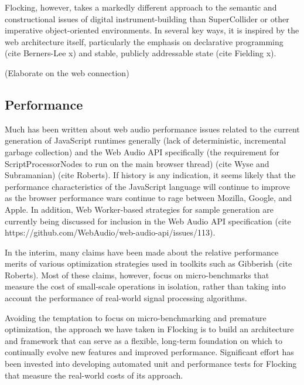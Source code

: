 \documentclass{article}
\begin{document}
Flocking, however, takes a markedly different approach to the semantic and constructional issues of digital instrument-building than SuperCollider or other imperative object-oriented environments. In several key ways, it is inspired by the web architecture itself, particularly the emphasis on declarative programming (cite Berners-Lee x) and stable, publicly addressable state (cite Fielding x).

(Elaborate on the web connection)

\subsection{Performance}

Much has been written about web audio performance issues related to the current generation of JavaScript runtimes generally (lack of deterministic, incremental garbage collection) and the Web Audio API specifically (the requirement for ScriptProcessorNodes to run on the main browser thread) (cite Wyse and Subramanian) (cite Roberts). If history is any indication, it seems likely that the performance characteristics of the JavaScript language will continue to improve as the browser performance wars continue to rage between Mozilla, Google, and Apple. In addition, Web Worker-based strategies for sample generation are currently being discussed for inclusion in the Web Audio API specification (cite https://github.com/WebAudio/web-audio-api/issues/113).

In the interim, many claims have been made about the relative performance merits of various optimization strategies used in toolkits such as Gibberish (cite Roberts). Most of these claims, however, focus on micro-benchmarks that measure the cost of small-scale operations in isolation, rather than taking into account the performance of real-world signal processing algorithms.

Avoiding the temptation to focus on micro-benchmarking and premature optimization, the approach we have taken in Flocking is to build an architecture and framework that can serve as a flexible, long-term foundation on which to continually evolve new features and improved performance. Significant effort has been invested into developing automated unit and performance tests for Flocking that measure the real-world costs of its approach.
\end{document}
